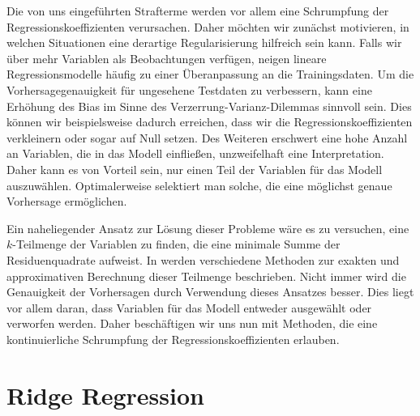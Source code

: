Die von uns eingeführten Strafterme werden vor allem eine Schrumpfung der Regressionskoeffizienten verursachen. Daher möchten wir zunächst motivieren, in welchen Situationen eine derartige Regularisierung hilfreich sein kann. Falls wir über mehr Variablen als Beobachtungen verfügen, neigen lineare Regressionsmodelle häufig zu einer Überanpassung an die Trainingsdaten. Um die Vorhersagegenauigkeit für ungesehene Testdaten zu verbessern, kann eine Erhöhung des Bias im Sinne des Verzerrung-Varianz-Dilemmas sinnvoll sein. Dies können wir beispielsweise dadurch erreichen, dass wir die Regressionskoeffizienten verkleinern oder sogar auf Null setzen. Des Weiteren erschwert eine hohe Anzahl an Variablen, die in das Modell einfließen, unzweifelhaft eine Interpretation. Daher kann es von Vorteil sein, nur einen Teil der Variablen für das Modell auszuwählen. Optimalerweise selektiert man solche, die eine möglichst genaue Vorhersage ermöglichen.

Ein naheliegender Ansatz zur Lösung dieser Probleme wäre es zu versuchen, eine $k$-Teilmenge der Variablen zu finden, die eine minimale Summe der Residuenquadrate aufweist. In \cite{hastie_elements} werden verschiedene Methoden zur exakten und approximativen Berechnung dieser Teilmenge beschrieben. Nicht immer wird die Genauigkeit der Vorhersagen durch Verwendung dieses Ansatzes besser. Dies liegt vor allem daran, dass Variablen für das Modell entweder ausgewählt oder verworfen werden. Daher beschäftigen wir uns nun mit Methoden, die eine kontinuierliche Schrumpfung der Regressionskoeffizienten erlauben.




\section{Ridge Regression}
\label{ridge_regression}

